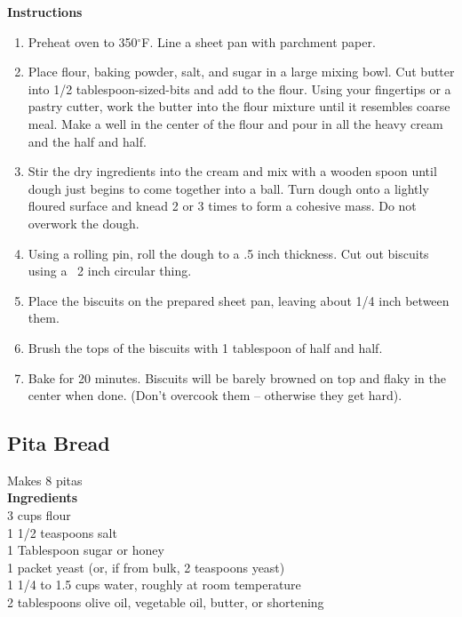 \documentclass{article}
\numberwithin{figure}{section}
\numberwithin{equation}{section}
\begin{document}
{\bf Instructions}
\begin{enumerate}
\item Preheat oven to 350$^\circ$F. Line a sheet pan with parchment paper.

\item Place flour, baking powder, salt, and sugar in a large mixing bowl. Cut butter into 1/2 tablespoon-sized-bits and add to the flour. Using your fingertips or a pastry cutter, work the butter into the flour mixture until it resembles coarse meal. Make a well in the center of the flour and pour in all the heavy cream and the half and half.

\item Stir the dry ingredients into the cream and mix with a wooden spoon until dough just begins to come together into a ball. Turn dough onto a lightly floured surface and knead 2 or 3 times to form a cohesive mass. Do not overwork the dough.

\item Using a rolling pin, roll the dough to a .5 inch thickness.  Cut out biscuits using a ~2 inch circular thing.

\item Place the biscuits on the prepared sheet pan, leaving about 1/4 inch between them.

\item Brush the tops of the biscuits with 1 tablespoon of half and half.

\item Bake for 20 minutes. Biscuits will be barely browned on top and flaky in the center when done. (Don’t overcook them – otherwise they get hard).
\end{enumerate}


\pagebreak
\subsection{Pita Bread}
Makes 8 pitas\\

{\bf Ingredients}\\
3 cups flour\\
1 1/2 teaspoons salt\\
1 Tablespoon sugar or honey\\
1 packet yeast (or, if from bulk, 2 teaspoons yeast)\\
1 1/4 to 1.5 cups water, roughly at room temperature\\
2 tablespoons olive oil, vegetable oil, butter, or shortening\\
\end{document}
